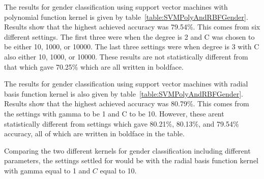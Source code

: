 \documentclass[a4paper]{llncs}
\begin{document}

  
 
The results for gender classification using support vector machines with polynomial function kernel is given by table~\ref{table:SVMPolyAndRBFGender}. Results show  that the highest achieved accuracy was 79.54\%. This comes from six different settings. The first three were when the degree is 2 and C was chosen to be either 10, 1000, or 10000. The last three settings were when degree is 3 with C also either 10, 1000, or 10000. These results are not statistically different from that which gave 70.25\% which are all written in boldface. 


The results for gender classification using support vector machines with radial basis function kernel is also given by table~\ref{table:SVMPolyAndRBFGender}. Results show  that the highest achieved accuracy was 80.79\%. This comes from the settings with gamma to be 1 and C to be 10. However, these arent statistically different from settings which gave 80.21\%, 80.13\%, and 79.54\% accuracy, all of which are written in boldface in the table.

Comparing the two different kernels for gender classification including different parameters, the settings settled for would be with the radial basis function kernel with gamma equal to 1 and $C$ equal to 10.  
\end{document}

